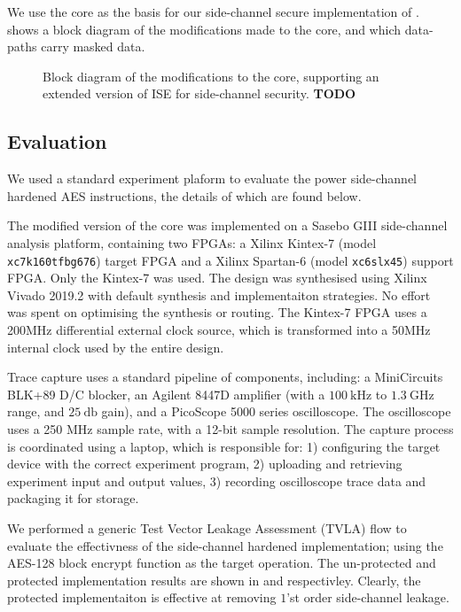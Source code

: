We use the  core as the basis for our side-channel secure
implementation of .
 shows a block diagram of the modifications
made to the core, and which data-paths carry masked data.

\begin{figure}
\caption{Block diagram of the modifications to the  core,
supporting an extended version of ISE  for side-channel
security. {\bf TODO}}
\label{fig:sca:uarch}
\end{figure}


\subsection{Evaluation}

We used a standard experiment plaform to evaluate the power side-channel
hardened AES  instructions, the details of which are found
below.

The modified version of the  core was implemented on a
Sasebo GIII \cite{HKSS:12}
side-channel analysis platform, containing two FPGAs:
a Xilinx  Kintex-7 
(model {\tt xc7k160tfbg676})
target  FPGA 
and
a Xilinx Spartan-6
(model {\tt xc6slx45})
support FPGA.
Only the Kintex-7 was used.
The design was synthesised using Xilinx Vivado 2019.2 with
default synthesis and implementaiton strategies.
No effort was spent on optimising the synthesis or routing.
The Kintex-7 FPGA uses a 200MHz differential external clock source, which is
transformed into a 50MHz internal clock used by the entire
design.

Trace capture uses a standard pipeline of components, including:
a MiniCircuits BLK+89 D/C blocker,
an Agilent 8447D amplifier (with a $\SI{100}{\kilo\hertz}$ to $\SI{1.3}{\giga\hertz}$ range, and $\SI{25}{\decibel}$ gain),
and
a  PicoScope 5000 series oscilloscope.
The oscilloscope uses a 250 MHz sample rate, with a 12-bit sample resolution.
The capture process is coordinated using a laptop, which is responsible for:
1) configuring the target device with the correct experiment program,
2) uploading and retrieving experiment input and output values,
3) recording oscilloscope trace data and packaging it for storage.

We performed a generic Test Vector Leakage Assessment (TVLA) flow to evaluate
the effectivness of the side-channel hardened implementation;
using the AES-128 block encrypt function as the target operation.
The un-protected and protected implementation results are shown in
 and
 respectivley.
Clearly, the protected implementaiton is effective at removing $1$'st
order side-channel leakage.


